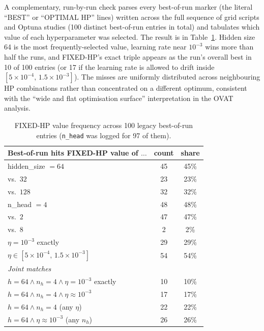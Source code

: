 \documentclass[twocolumn,twoside,a4paper,10pt]{IEEEtran}
\begin{document}
A complementary, run-by-run check parses every best-of-run marker (the literal ``BEST'' or ``OPTIMAL HP'' lines) written across the full sequence of grid scripts and Optuna studies (100 distinct best-of-run entries in total) and tabulates which value of each hyperparameter was selected. The result is in Table~\ref{tab:bestcounts}. Hidden size 64 is the most frequently-selected value, learning rate near $10^{-3}$ wins more than half the runs, and FIXED-HP's exact triple appears as the run's overall best in 10 of 100 entries (or 17 if the learning rate is allowed to drift inside $[5\!\times\!10^{-4},\,1.5\!\times\!10^{-3}]$). The misses are uniformly distributed across neighbouring HP combinations rather than concentrated on a different optimum, consistent with the ``wide and flat optimisation surface'' interpretation in the OVAT analysis.

\begin{table}[!ht]
    \caption{FIXED-HP value frequency across 100 legacy best-of-run entries (\texttt{n\_head} was logged for 97 of them).}
    \label{tab:bestcounts}
    \begin{center}
    \footnotesize
    \begin{tabular}{lcc}
        \toprule
        Best-of-run hits FIXED-HP value of $\dots$ & count & share \\
        \midrule
        hidden\_size $= 64$           & 45 & 45\% \\
        \quad vs.\ $32$               & 23 & 23\% \\
        \quad vs.\ $128$              & 32 & 32\% \\
        n\_head $= 4$                 & 48 & 48\% \\
        \quad vs.\ $2$                & 47 & 47\% \\
        \quad vs.\ $8$                & 2  & 2\% \\
        $\eta = 10^{-3}$ exactly      & 29 & 29\% \\
        $\eta \in [5\!\times\!10^{-4},\,1.5\!\times\!10^{-3}]$ & 54 & 54\% \\
        \midrule
        \multicolumn{3}{l}{\emph{Joint matches}} \\
        $h{=}64 \land n_h{=}4 \land \eta = 10^{-3}$ exactly & 10 & 10\% \\
        $h{=}64 \land n_h{=}4 \land \eta \approx 10^{-3}$   & 17 & 17\% \\
        $h{=}64 \land n_h{=}4$ (any $\eta$)                 & 22 & 22\% \\
        $h{=}64 \land \eta \approx 10^{-3}$ (any $n_h$)     & 26 & 26\% \\
        \bottomrule
    \end{tabular}
    \end{center}
\end{table}
\end{document}
